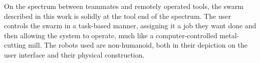 On the spectrum between teammates and remotely operated tools, the swarm described in this work is solidly at the tool end of the spectrum. 
The user controls the swarm in a task-based manner, assigning it a job they want done and then allowing the system to operate, much like a computer-controlled metal-cutting mill.
The robots used are non-humanoid, both in their depiction on the user interface and their physical construction. 

